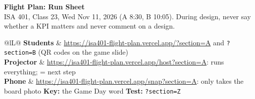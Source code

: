 \documentclass[10pt,letterpaper]{article}
\newcommand{\key}[1]{{\setlength{\fboxsep}{0.8pt}\fbox{\ttfamily\bfseries #1}}}
\newcommand{\site}{isa401-flight-plan.vercel.app}
\begin{document}
\small

\begin{center}
	{\Large\bfseries Flight Plan: Run Sheet}\\[1pt]
	{\small ISA 401, Class 23, Wed Nov 11, 2026 (A 8:30, B 10:05). During design, never say whether a KPI matters and never comment on a design.}
\end{center}

\vspace{-4pt}
\begin{tabularx}{\textwidth}{@{}lL@{}}
	\hline
	\textbf{Students} & \url{https://\site/?section=A} \quad and \quad \texttt{?section=B} \quad (QR codes on the game slide) \\
	\textbf{Projector} & \url{https://\site/host?section=A}: runs everything; \key{Space} = next step \\
	\textbf{Phone} & \url{https://\site/snap?section=A}: only takes the board photo \qquad \textbf{Key:} the Game Day word \qquad \textbf{Test:} \texttt{?section=Z} \\
	\hline
\end{tabularx}
\end{document}
